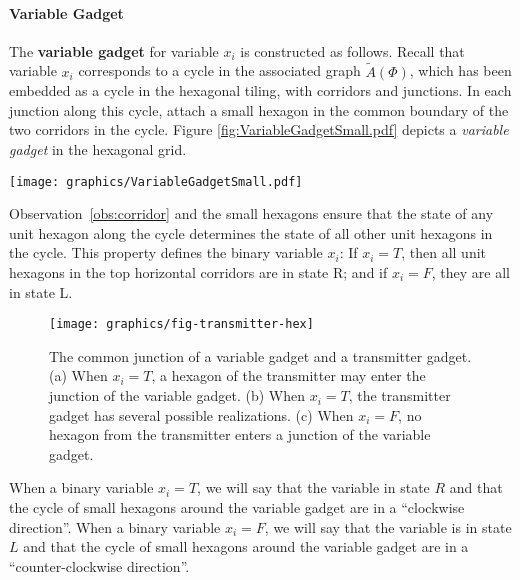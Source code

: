 \paragraph{Variable Gadget}
The {\bf variable gadget} for variable $x_i$ is constructed as follows. 
Recall that variable $x_i$ corresponds to a cycle in the associated graph $\tilde{A}(\Phi)$, which has been embedded as a cycle in the hexagonal tiling, with corridors and junctions. 
In each junction along this cycle, attach a small hexagon in the common boundary of the two corridors in the cycle. 
Figure \ref{fig:VariableGadgetSmall.pdf} depicts a \textit{variable gadget} in the hexagonal grid.

\begin{minipage}{\linewidth}
\begin{center}
\texttt{[image: graphics/VariableGadgetSmall.pdf]}
\label{fig:VariableGadgetSmall.pdf}
\end{center}
\end{minipage}

Observation~\ref{obs:corridor} and the small hexagons ensure that the state of any unit hexagon along the cycle determines the state of all other unit hexagons in the cycle. 
This property defines the binary variable $x_i$: If $x_i=T$, then all unit hexagons in the top horizontal corridors are in state R; and if $x_i=F$, they are all in state L.
\begin{figure}[htbp]
	\centering
	\texttt{[image: graphics/fig-transmitter-hex]}
	\caption{The common junction of a variable gadget and a transmitter gadget.
(a) When $x_i=T$, a hexagon of the transmitter may enter the junction of the variable gadget.
(b) When $x_i=T$, the transmitter gadget has several possible realizations.
(c) When $x_i=F$, no hexagon from the transmitter enters a junction of the variable gadget.}
	\label{fig:transmitter}
\end{figure}
When a binary variable $x_i = T$, we will say that the variable in state $R$ and that the cycle of small hexagons around the variable gadget are in a ``clockwise direction''.
When a binary variable $x_i = F$, we will say that the variable is in state $L$ and that the cycle of small hexagons around the variable gadget are in a ``counter-clockwise direction''. 

